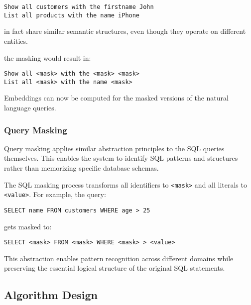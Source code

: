 \begin{verbatim}
Show all customers with the firstname John
List all products with the name iPhone
\end{verbatim}

in fact share similar semantic structures, even though they operate on different entities.


the masking would result in:

\begin{verbatim}
Show all <mask> with the <mask> <mask>
List all <mask> with the name <mask>
\end{verbatim}

Embeddings can now be computed for the masked versions of the natural language queries.

\subsubsection{Query Masking}

Query masking applies similar abstraction principles to the SQL queries themselves.
This enables the system to identify SQL patterns and structures rather than
memorizing specific database schemas.

The SQL masking process transforms all identifiers to \texttt{<mask>} and all literals
to \texttt{<value>}. For example, the query:

\begin{verbatim}
SELECT name FROM customers WHERE age > 25
\end{verbatim}

gets masked to:

\begin{verbatim}
SELECT <mask> FROM <mask> WHERE <mask> > <value>
\end{verbatim}

This abstraction enables pattern recognition across different domains while
preserving the essential logical structure of the original SQL statements.









\subsection{Algorithm Design}

